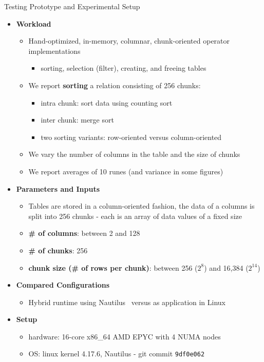 \begin{block}{Testing Prototype and Experimental Setup}
  \begin{itemize}
    \item \textbf{Workload}
      \begin{itemize}
      \item Hand-optimized, in-memory, columnar, chunk-oriented operator
        implementations
    \begin{itemize}
    \item sorting, selection (filter), creating, and freeing tables
      \end{itemize}
  \item We report \textbf{sorting} a relation consisting of 256 chunks:
    \begin{itemize}
    \item intra chunk: sort data using counting sort
    \item inter chunk: merge sort
    \item two sorting variants: row-oriented versus column-oriented
\end{itemize}
\item We vary the number of columns in the table and the size of chunks
\item We report averages of 10 runes (and variance in some figures)
  \end{itemize}
\item \textbf{Parameters and Inputs}
  \begin{itemize}
  \item Tables are stored in a column-oriented fashion, the data of a columns is split into 256 chunks - each is an array of data values of a fixed size 
  \item \textbf{\# of columns}: between 2 and 128
  \item \textbf{\# of chunks}: 256
  \item \textbf{chunk size (\# of rows per chunk)}: between 256 ($2^8$) and 16,384 ($2^{14}$)
  \end{itemize}
\item \textbf{Compared Configurations}
    \begin{itemize}
    \item Hybrid runtime using Nautilus~\cite{HALE:2015:NAUTILUS} versus as application in Linux 
    \end{itemize}
  \item \textbf{Setup}
    \begin{itemize}
    \item hardware: 16-core x86\_64 AMD EPYC with 4 NUMA nodes
    \item OS: linux kernel 4.17.6, Nautilus - git commit \texttt{9df0e062}
    \end{itemize}
  \end{itemize}
\end{block}
